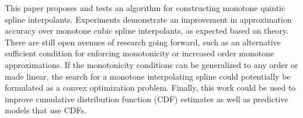 
This paper proposes and tests an algorithm for constructing monotone
quintic spline interpolants. Experiments demonstrate an improvement in
approximation accuracy over monotone cubic spline interpolants, as
expected based on theory. There are still open avenues of research
going forward, such as an alternative sufficient condition for
enforcing monotonicity or increased order monotone approximations. If
the monotonicity conditions can be generalized to any order or made
linear, the search for a monotone interpolating spline could
potentially be formulated as a convex optimization problem. Finally,
this work could be used to improve cumulative distribution function
(CDF) estimates as well as predictive models that use CDFs.
